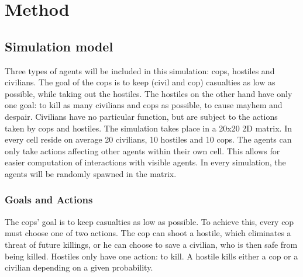 \section{Method}
\subsection{Simulation model}
Three types of agents will be included in this simulation: cops, hostiles and civilians. The goal of the cops is to keep (civil and cop) casualties as low as possible, while taking out the hostiles. The hostiles on the other hand have only one goal: to kill as many civilians and cops as possible, to cause mayhem and despair. Civilians have no particular function, but are subject to the actions taken by cops and hostiles. The simulation takes place in a 20x20 2D matrix. In every cell reside on average 20 civilians, 10 hostiles and 10 cops. The agents can only take actions affecting other agents within their own cell. This allows for easier computation of interactions with visible agents. In every simulation, the agents will be randomly spawned in the matrix.  

\subsubsection{Goals and Actions}
The cops' goal is to keep casualties as low as possible. To achieve this, every cop must choose one of two actions. The cop can shoot a hostile, which eliminates a threat of future killings, or he can choose to save a civilian, who is then safe from being killed. Hostiles only have one action: to kill. A hostile kills either a cop or a civilian depending on a given probability. 


